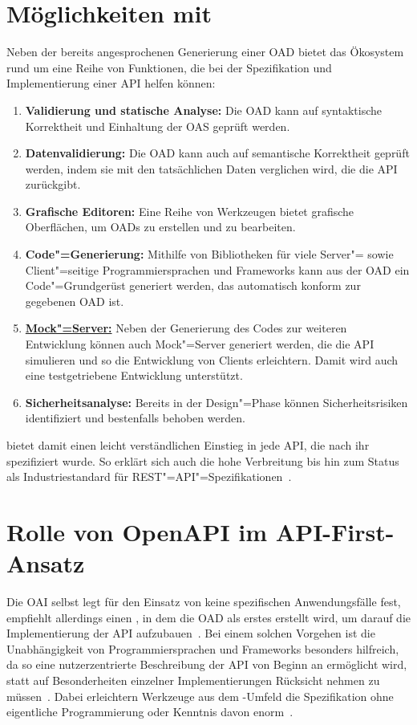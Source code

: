 \section{Möglichkeiten mit \OA}
Neben der bereits angesprochenen Generierung einer \ac{OAD} bietet das Ökosystem rund um \OA eine Reihe von Funktionen, die bei der Spezifikation und Implementierung einer \ac{API} helfen können:
\begin{enumerate}
	\item \textbf{Validierung und statische Analyse:} Die \ac{OAD} kann auf syntaktische Korrektheit und Einhaltung der \ac{OAS} geprüft werden.
	\item \textbf{Datenvalidierung:} Die \ac{OAD} kann auch auf semantische Korrektheit geprüft werden, indem sie mit den tatsächlichen Daten verglichen wird, die die \ac{API} zurückgibt.
	\item \textbf{Grafische Editoren:} Eine Reihe von Werkzeugen bietet grafische Oberflächen, um \acp{OAD} zu erstellen und zu bearbeiten.
	\item \textbf{Code"=Generierung:} Mithilfe von Bibliotheken für viele Server"= sowie Client"=seitige Programmiersprachen und Frameworks kann aus der \ac{OAD} ein Code"=Grundgerüst generiert werden, das automatisch konform zur gegebenen \ac{OAD} ist.
	\item \textbf{\hyperref[sec:mock-server]{Mock"=Server:}} Neben der Generierung des Codes zur weiteren Entwicklung können auch Mock"=Server generiert werden, die die \ac{API} simulieren und so die Entwicklung von Clients erleichtern. Damit wird auch eine testgetriebene Entwicklung unterstützt.
	\item \textbf{Sicherheitsanalyse:} Bereits in der Design"=Phase können Sicherheitsrisiken identifiziert und bestenfalls behoben werden.
\end{enumerate}\cite{ope23}

\OA bietet damit einen leicht verständlichen Einstieg in jede \ac{API}, die nach ihr spezifiziert wurde.
So erklärt sich auch die hohe Verbreitung bis hin zum Status als Industriestandard für \acs{REST}"=\acs{API}"=Spezifikationen~\cite{ope}.

\section{Rolle von OpenAPI im API-First-Ansatz}
Die \ac{OAI} selbst legt für den Einsatz von \OA keine spezifischen Anwendungsfälle fest, empfiehlt allerdings einen \AFA, in dem die \ac{OAD} als erstes erstellt wird, um darauf die Implementierung der \ac{API} aufzubauen~\cites{ope,ope24}.
Bei einem solchen Vorgehen ist die Unabhängigkeit von Programmiersprachen und Frameworks besonders hilfreich, da so eine nutzerzentrierte Beschreibung der \ac{API} von Beginn an ermöglicht wird, statt auf Besonderheiten einzelner Implementierungen Rücksicht nehmen zu müssen~\cite{ope}.
Dabei erleichtern Werkzeuge aus dem \OA-Umfeld die Spezifikation ohne eigentliche Programmierung oder Kenntnis davon enorm~\cites[1629]{cha21}{ope24}.

